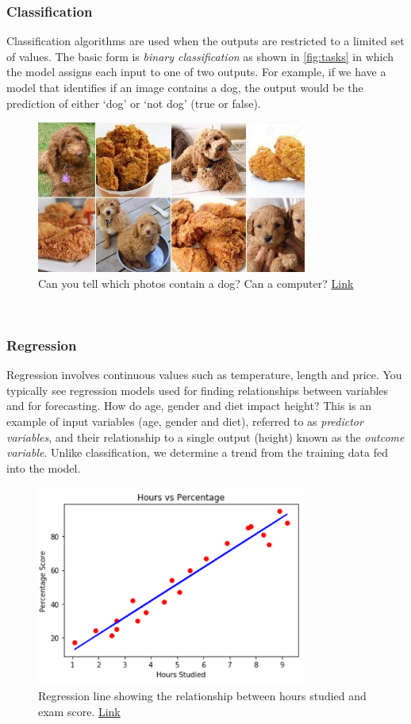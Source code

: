 \documentclass{article}
\begin{document}
\subsubsection{Classification}
Classification algorithms are used when the outputs are restricted to a limited set of values. The basic form is \textit{binary classification} as shown in \ref{fig:tasks} in which the model assigns each input to one of two outputs. For example, if we have a model that identifies if an image contains a dog, the output would be the prediction of either `dog' or `not dog' (true or false).  

\begin{figure}[H]
    \centering
    \includegraphics[width=3.5in]{dogs.jpg}
    \caption{Can you tell which photos contain a dog? Can a computer? \href{https://www.npr.org/sections/thesalt/2016/03/11/470084215/canine-or-cuisine-this-photo-meme-is-fetching}{Link}}
    \label{fig:dogs}
\end{figure}

\newpage
\subsubsection{Regression}
Regression involves continuous values such as temperature, length and price. You typically see regression models used for finding relationships between variables and for forecasting. How do age, gender and diet impact height? This is an example of input variables (age, gender and diet), referred to as \textit{predictor variables}, and their relationship to a single output (height) known as the \textit{outcome variable}. Unlike classification, we determine a trend from the training data fed into the model.  

\begin{figure}[H]
    \centering
    \includegraphics[width=3.5in]{regression.png}
    \caption{Regression line showing the relationship between hours studied and exam score. \href{https://stackabuse.com/linear-regression-in-python-with-scikit-learn/}{Link}}
    \label{fig:regression}
\end{figure}
\end{document}

